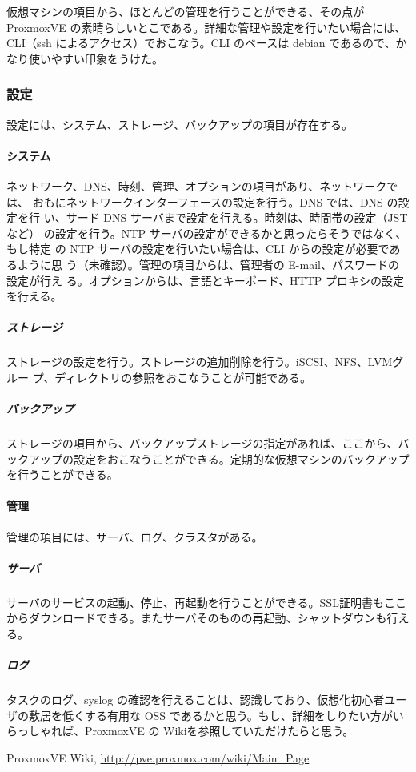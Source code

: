 \documentclass[mingoth,a4paper]{jsarticle}
\begin{document}
仮想マシンの項目から、ほとんどの管理を行うことができる、その点が
ProxmoxVE の素晴らしいとこである。詳細な管理や設定を行いたい場合には、
CLI（ssh によるアクセス）でおこなう。CLI のベースは debian であるので、かなり使いやすい印象をうけた。

\subsubsection{設定}
設定には、システム、ストレージ、バックアップの項目が存在する。

\paragraph{システム}
ネットワーク、DNS、時刻、管理、オプションの項目があり、ネットワークでは、
おもにネットワークインターフェースの設定を行う。DNS では、DNS の設定を行
い、サード DNS サーバまで設定を行える。時刻は、時間帯の設定（JST など）
の設定を行う。NTP サーバの設定ができるかと思ったらそうではなく、もし特定
の NTP サーバの設定を行いたい場合は、CLI からの設定が必要であるように思
う（未確認）。管理の項目からは、管理者の E-mail、パスワードの設定が行え
る。オプションからは、言語とキーボード、HTTP プロキシの設定を行える。

\subparagraph{ストレージ}
ストレージの設定を行う。ストレージの追加削除を行う。iSCSI、NFS、LVMグルー
プ、ディレクトリの参照をおこなうことが可能である。

\subparagraph{バックアップ}
ストレージの項目から、バックアップストレージの指定があれば、ここから、バックアップの設定をおこなうことができる。定期的な仮想マシンのバックアップを行うことができる。

\paragraph{管理}
管理の項目には、サーバ、ログ、クラスタがある。

\subparagraph{サーバ}
サーバのサービスの起動、停止、再起動を行うことができる。SSL証明書もここからダウンロードできる。またサーバそのものの再起動、シャットダウンも行える。

\subparagraph{ログ}
タスクのログ、syslog の確認を行えることは、認識しており、仮想化初心者ユー
ザの敷居を低くする有用な OSS であるかと思う。もし、詳細をしりたい方がい
らっしゃれば、ProxmoxVE の Wiki\cite{proxmoxvewiki}を参照していただけたらと思う。

\begin{thebibliography}{}
  ProxmoxVE Wiki, \url{http://pve.proxmox.com/wiki/Main_Page}
\end{thebibliography}
\end{document}

